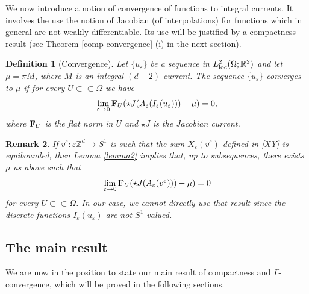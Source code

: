 \documentclass[11pt]{article}
\newtheorem{definition}{Definition}[section]
\newtheorem{remark}[definition]{Remark}
\def\e{\varepsilon}
\begin{document}
\smallskip
We now introduce a notion of convergence of functions to integral currents. It involves the use the notion of Jacobian (of interpolations) for functions which in general are not weakly differentiable.
Its use will be justified by a compactness result (see  Theorem \ref{comp-convergence} (i) in the next section). 

\begin{definition}[Convergence]\label{conv}
Let $\{u_\e\}$ be a sequence in $L^2_{\rm loc}(\Omega;\mathbb R^2)$ and let $\mu=\pi M$, where 
$M$ is an integral $(d-2)$-current.  
The sequence $\{u_\e\}$ {\rm converges to} $\mu$ if 
for every $U\subset\subset\Omega$ we have  
$$\lim_{\e\to 0}{\bf F}_U(\star J(A_\e(I_\e(u_\e)))-\mu)=0,$$
where ${\bf F}_U$ is the flat norm in $U$ and $\star J$ is the Jacobian current. 
\end{definition}
\begin{remark}\label{conv-discreta}\rm 
If $v^\e\colon\e \mathbb Z^d\to S^1$ is such that the sum $X_\e(v^\e)$ defined in \eqref{XY} is equibounded, then Lemma \ref{lemma2} implies that, up to subsequences, there exists $\mu$ as above such that
$$\lim_{\e\to 0}{\bf F}_U(\star J(A_\e(v^\e)))-\mu)=0$$
for every $U\subset\subset\Omega$. 
In our case, we cannot directly use that result since the discrete functions $I_\e(u_\e)$ are not $S^1$-valued. 
\end{remark}

\subsection{The main result}
We are now in the position to state our main result of compactness and $\Gamma$-convergence, 
which will be proved in the following sections. 
\end{document}
